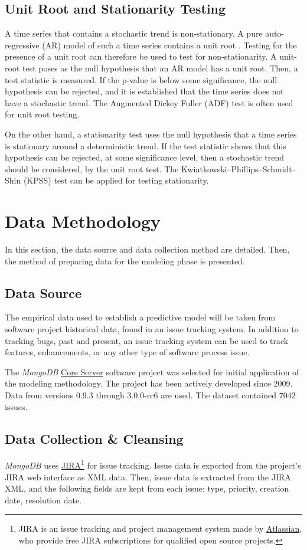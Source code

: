 \documentclass[letterpaper]{report}
\begin{document}
\section*{Unit Root and Stationarity Testing}
A time series that contains a stochastic trend is non-stationary. A pure auto-regressive (AR) model of such a time series contains a unit root \cite{franses1998time}. Testing for the presence of a unit root can therefore be used to test for non-stationarity. A unit-root test poses as the null hypothesis that an AR model has a unit root. Then, a test statistic is measured. If the p-value is below some significance, the null hypothesis can be rejected, and it is established that the time series does not have a stochastic trend. The Augmented Dickey Fuller (ADF) test is often used for unit root testing.

On the other hand, a stationarity test uses the null hypothesis that a time series is stationary around a deterministic trend. If the test statistic shows that this hypothesis can be rejected, at some significance level, then a stochastic trend should be considered, by the unit root test. The Kwiatkowski–Phillips–Schmidt–Shin (KPSS) test can be applied for testing stationarity.

\chapter{Data Methodology}
\label{sec:data_methodology}

In this section, the data source and data collection method are detailed. Then, the method of preparing data for the modeling phase is presented.

\section*{Data Source}
The empirical data used to establish a predictive model will be taken from software project historical data, found in an issue tracking system. In addition to tracking bugs, past and present, an issue tracking system can be used to track features, enhancements, or any other type of software process issue. 

The \textit{MongoDB} \href{https://jira.mongodb.org/browse/SERVER}{Core Server} software project was selected for initial application of the modeling methodology. The project has been actively developed since 2009. Data from versions 0.9.3 through 3.0.0-rc6 are used. The dataset contained $7042$ issues.

\section*{Data Collection \& Cleansing}
\textit{MongoDB} uses \href{https://www.atlassian.com/software/jira}{JIRA}\footnote{JIRA is an issue tracking and project management system made by \href{https://www.atlassian.com/}{Atlassian}, who provide free JIRA subscriptions for qualified open source projects.} for issue tracking. Issue data is exported from the project's JIRA web interface as XML data. Then, issue data is extracted from the JIRA XML, and the following fields are kept from each issue: type, priority, creation date, resolution date.
\end{document}
